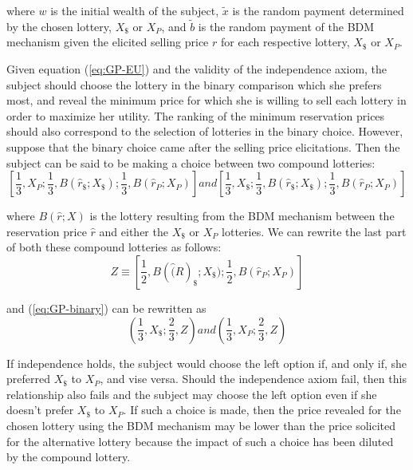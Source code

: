 \documentclass[../main.tex]{subfiles}
\begin{document}
\noindent where $w$ is the initial wealth of the subject, $\tilde{x}$ is the random payment determined by the chosen lottery, $X_{\$}$ or $X_P$, and $\tilde{b}$ is the random payment of the BDM mechanism given the elicited selling price $r$ for each respective lottery, $X_{\$}$ or $X_P$.

Given equation (\ref{eq:GP-EU}) and the validity of the independence axiom, the subject should choose the lottery in the binary comparison which she prefers most, and reveal the minimum price for which she is willing to sell each lottery in order to maximize her utility.
The ranking of the minimum reservation prices should also correspond to the selection of lotteries in the binary choice.
However, suppose that the binary choice came after the selling price elicitations.
Then the subject can be said to be making a choice between two compound lotteries:
\begin{equation}
	\label{eq:GP-binary}
	\left[ \frac{1}{3},X_P;\frac{1}{3},B(\hat{r}_{\$} ; X_{\$}) ; \frac{1}{3}, B(\hat{r}_P ; X_P)\right]   \textit{and}   \left[ \frac{1}{3},X_{\$};\frac{1}{3},B(\hat{r}_{\$} ; X_{\$}) ; \frac{1}{3}, B(\hat{r}_P ; X_P) \right]
\end{equation}

\noindent where $B(\hat{r};X)$ is the lottery resulting from the BDM mechanism between the reservation price $\hat{r}$ and either the $X_{\$}$ or $X_P$ lotteries.
We can rewrite the last part of both these compound lotteries as follows:
\begin{equation}
	Z \equiv \left[ \frac{1}{2}, B(\hat(R)_{\$};X_{\$})  ; \frac{1}{2},B(\hat{r}_P ; X_P)  \right]
\end{equation}

\noindent and (\ref{eq:GP-binary}) can be rewritten as
\begin{equation}
	\label{eq:GP-bin-reduced}
	\left( \frac{1}{3}, X_{\$} ; \frac{2}{3},Z \right) \textit{and} \left( \frac{1}{3},X_P ; \frac{2}{3},Z  \right)
\end{equation}

If independence holds, the subject would choose the left option if, and only if, she preferred $X_{\$}$ to $X_P$, and vise versa.
Should the independence axiom fail, then this relationship also fails and the subject may choose the left option even if she doesn't prefer $X_{\$}$ to $X_P$.
If such  a choice is made, then the price revealed for the chosen lottery using the BDM mechanism may be lower than the price solicited for the alternative lottery because the impact of such a choice has been diluted by the compound lottery. 
\end{document}
